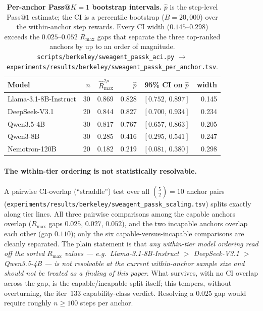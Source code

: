 \documentclass{article}
\begin{document}
\begin{table}[t]
  \centering
  \small
  \begin{tabular}{lrrrcr}
    \toprule
    Model & $n$ & $\hat R_{\max}^{2p}$ & $\hat p$ &
    95\% CI on $\hat p$ & width \\
    \midrule
    Llama-3.1-8B-Instruct & 30 & 0.869 & 0.828 & $[0.752,\,0.897]$ & 0.145 \\
    DeepSeek-V3.1         & 20 & 0.844 & 0.827 & $[0.700,\,0.934]$ & 0.234 \\
    Qwen3.5-4B            & 30 & 0.817 & 0.767 & $[0.657,\,0.863]$ & 0.205 \\
    Qwen3-8B              & 30 & 0.285 & 0.416 & $[0.295,\,0.541]$ & 0.247 \\
    Nemotron-120B         & 20 & 0.182 & 0.219 & $[0.081,\,0.380]$ & 0.298 \\
    \bottomrule
  \end{tabular}
  \caption{\textbf{Per-anchor Pass@$K{=}1$ bootstrap intervals.}
    $\hat p$ is the step-level Pass@$1$ estimate; the CI is a
    percentile bootstrap ($B = 20{,}000$) over the within-anchor step
    rewards.  Every CI width ($0.145$--$0.298$) exceeds the
    $0.025$--$0.052$ $R_{\max}$ gaps that separate the three
    top-ranked anchors by up to an order of magnitude.
    \texttt{scripts/berkeley/sweagent\_passk\_aci.py} $\to$
    \texttt{experiments/results/berkeley/sweagent\_passk\_per\_anchor.tsv}.}
  \label{tab:scaling-passk-ci}
\end{table}

\paragraph{The within-tier ordering is not statistically resolvable.}
A pairwise CI-overlap (``straddle'') test over all
$\binom{5}{2} = 10$ anchor pairs
(\texttt{experiments/results/berkeley/sweagent\_passk\_scaling.tsv})
splits exactly along tier lines.  All three pairwise comparisons among
the capable anchors overlap ($R_{\max}$ gaps $0.025$, $0.027$,
$0.052$), and the two incapable anchors overlap each other (gap
$0.110$); only the six capable-versus-incapable comparisons are
cleanly separated.  The plain statement is that \emph{any within-tier
model ordering read off the sorted $R_{\max}$ values --- e.g.\
Llama-3.1-8B-Instruct $>$ DeepSeek-V3.1 $>$ Qwen3.5-4B --- is not
resolvable at the current within-anchor sample size and should not be
treated as a finding of this paper}.  What survives, with no CI
overlap across the gap, is the capable/incapable split itself; this
tempers, without overturning, the iter~133 capability-class verdict.
Resolving a $0.025$ gap
would require roughly $n \geq 100$ steps per anchor.
\end{document}
